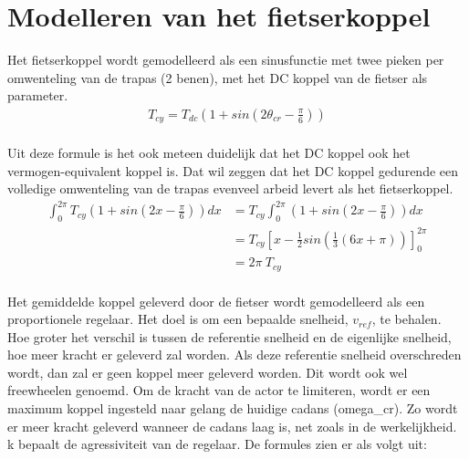 \section{Modelleren van het fietserkoppel}
Het fietserkoppel wordt gemodelleerd als een sinusfunctie met twee pieken per omwenteling van de trapas (2 benen), met het DC koppel van de fietser als parameter.
\\
\begin{gather*}
 T_{cy} = T_{dc}(1+sin(2\theta_{cr}-\frac{\pi}{6}))
\end{gather*}
\\
Uit deze formule is het ook meteen duidelijk dat het DC koppel ook het vermogen-equivalent koppel is. Dat wil zeggen dat het DC koppel gedurende een volledige omwenteling van de trapas evenveel arbeid levert als het fietserkoppel.
\\
\begin{align*}
\int_{0}^{2\pi} T_{cy}(1+sin(2x-\frac{\pi}{6})) dx &= T_{cy} \int_{0}^{2\pi}(1+sin(2x-\frac{\pi}{6})) dx\\
&= T_{cy} \left[x-\frac{1}{2}sin(\frac{1}{3}(6x+\pi))\right]_0^{2\pi}\\
&= 2\pi \ T_{cy}
\end{align*}
\\
Het gemiddelde koppel geleverd door de fietser wordt gemodelleerd als een proportionele regelaar. Het doel is om een bepaalde snelheid, $v_{ref}$, te behalen. Hoe groter het verschil is tussen de referentie snelheid en de eigenlijke snelheid, hoe meer kracht er geleverd zal worden. Als deze referentie snelheid overschreden wordt, dan zal er geen koppel meer geleverd worden. Dit wordt ook wel freewheelen genoemd. Om de kracht van de actor te limiteren, wordt er een maximum koppel ingesteld naar gelang de huidige cadans (\gls{omega_cr}). Zo wordt er meer kracht geleverd wanneer de cadans laag is, net zoals in de werkelijkheid. \gls{k} bepaalt de agressiviteit van de regelaar. De formules zien er als volgt uit:

